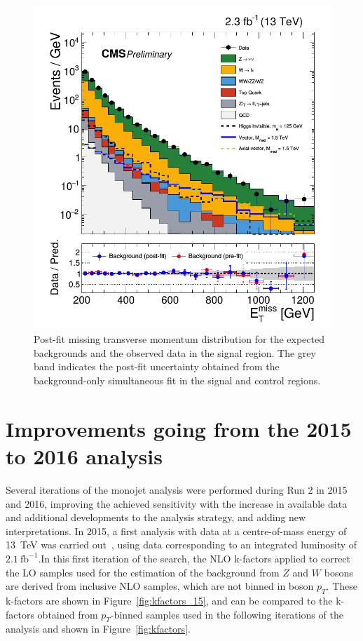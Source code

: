 \begin{figure}[ht]
  \centering
 \includegraphics[width=.7\textwidth]{results.png} 
 \caption{Post-fit missing transverse momentum distribution for the expected backgrounds and the observed data in the signal region. The grey band indicates the post-fit uncertainty obtained from the background-only simultaneous fit in the signal and control regions.}
 \label{fig:results}
\end{figure}

\section{Improvements going from the 2015 to 2016 analysis}
\label{sec:improvement}

Several iterations of the monojet analysis were performed during Run 2 in 2015 and 2016, improving the achieved sensitivity with the increase in available data and additional developments to the analysis strategy, and adding new interpretations. In 2015, a first analysis with data at a centre-of-mass energy of \SI{13}{TeV} was carried out~\cite{CMS:2015jdt}, using data corresponding to an integrated luminosity of $2.1\ \mathrm{fb}^{-1}$.In this first iteration of the search, the NLO k-factors applied to correct the \ac{LO} samples used for the estimation of the background from $Z$ and $W$ bosons are derived from inclusive \ac{NLO} samples, which are not binned in boson $p_T$. These k-factors are shown in Figure~\ref{fig:kfactors_15}, and can be compared to the k-factors obtained from $p_T$-binned samples used in the following iterations of the analysis and shown in Figure~\ref{fig:kfactors}.

